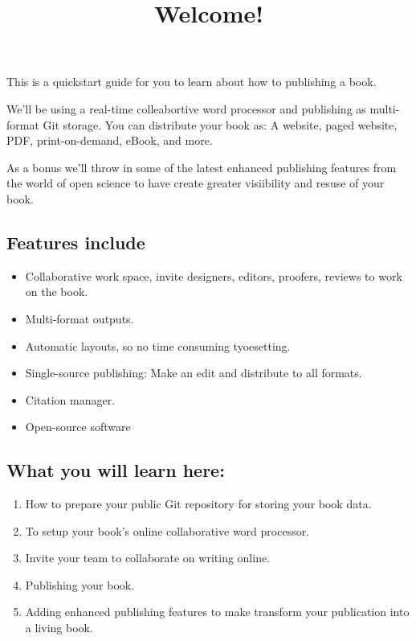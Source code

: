 \documentclass{article}
\begin{document}
\title{Welcome!}

\maketitle


This is a quickstart guide for you to learn about how to publishing a book.


We'll be using a real-time colleabortive word processor and publishing as multi-format Git storage. You can distribute your book as: A website, paged website, PDF, print-on-demand, eBook, and more.


As a bonus we'll throw in some of the latest enhanced publishing features from the world of open science to have create greater visiibility and resuse of your book.


\subsection{Features include}\label{H2087393}


\begin{itemize}
\item Collaborative work space, invite designers, editors, proofers, reviews to work on the book.


\item Multi-format outputs.


\item Automatic layouts, so no time consuming tyoesetting.


\item Single-source publishing: Make an edit and distribute to all formats.


\item Citation manager.


\item Open-source software


\end{itemize}

\subsection{What you will learn here:}\label{H7757657}


\begin{enumerate}
\item How to prepare your public Git repository for storing your book data.


\item To setup your book's online collaborative word processor.


\item Invite your team to collaborate on writing online.


\item Publishing your book. 


\item Adding enhanced publishing features to make transform your publication into a living book.


\end{enumerate}
\end{document}
